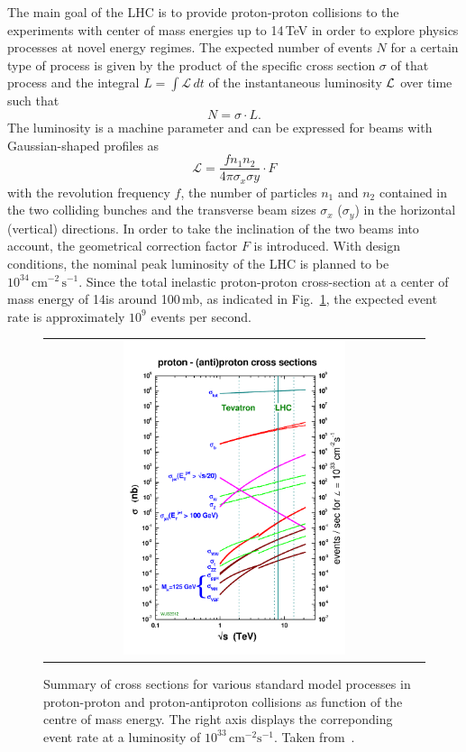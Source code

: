 The main goal of the LHC is to provide proton-proton collisions to the experiments with center of mass energies up to 14\,TeV in order to explore physics processes at novel energy regimes. The expected number of events $N$ for a certain type of process is given by the product of the specific cross section $\sigma$ of that process and the integral $L = \int \mathcal{L}  \, dt$ of the instantaneous luminosity $\cal L$ over time such that
\begin{equation}
  N = \sigma \cdot L . 
  \label{eq:lumi}
\end{equation}
The luminosity is a machine parameter and can be expressed for beams with Gaussian-shaped profiles as  
\begin{equation}
  \mathcal{L} = \frac{f n_{1} n_{2}}{4 \pi \sigma_{x} \sigma{y}} \cdot F
  \label{eq:lumi}
\end{equation}
with the revolution frequency $f$, the number of particles $n_1$ and $n_2$ contained in the two colliding bunches and the transverse beam sizes $\sigma_{x}$ ($\sigma_{y}$) in the horizontal (vertical) directions. In order to take the inclination of the two beams into account, the geometrical correction factor $F$ is introduced. With design conditions, the nominal peak luminosity of the LHC is planned to be $10^{34} \, \mathrm{cm}^{-2} \, \mathrm{s}^{-1}$. Since the total inelastic proton-proton cross-section at a center of mass energy of 14\tev is around 100\,mb, as indicated in Fig.~\ref{fig:CrossSections}, the expected event rate is approximately $10^9$ events per second. \\
\begin{figure}[!tp]
  \centering
  \begin{tabular}{c}
    \includegraphics[width=0.60\textwidth]{figures/crosssections2012_v5-1.pdf}
  \end{tabular}
  \caption{Summary of cross sections for various standard model processes in proton-proton and proton-antiproton collisions as function of the centre of mass energy. The right axis displays the correponding event rate at a luminosity of $\mathrm{10^{33}\,cm^{-2} s^{-1}}$. Taken from~\cite{bib:stirling:pcom}.}
  \label{fig:CrossSections}
\end{figure}
